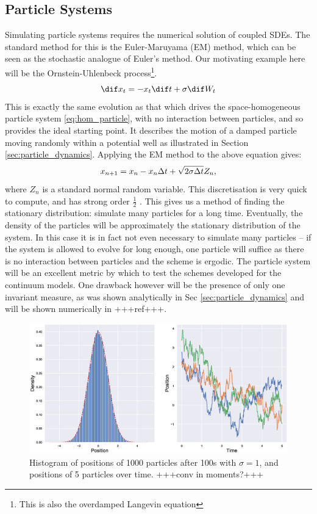     \subsection{Particle Systems}
    Simulating particle systems requires the numerical solution of coupled SDEs. The standard method for this is the Euler-Maruyama (EM) method, which can be seen as the stochastic analogue of Euler's method. Our motivating example here will be the Ornstein-Uhlenbeck process\footnote{This is also the overdamped Langevin equation}. 
    \begin{equation}
    \dif x_t = - x_t \dif t + \sigma \dif W_t
    \end{equation}
    This is exactly the same evolution as that which drives the space-homogeneous particle system \eqref{eq:hom_particle}, with no interaction between particles, and so provides the ideal starting point. It describes the motion of a damped particle moving randomly within a potential well as illustrated in Section \ref{sec:particle_dynamics}. Applying the EM method to the above equation gives:
    \[ x_{n+1} = x_n -  x_n\Delta t + \sqrt{2\sigma\Delta t}Z_n,  \]
    where $Z_n$ is a standard normal random variable. This discretisation is very quick to compute, and has strong order $\frac{1}{2}$ \cite{Higham01}. This gives us a method of finding the stationary distribution: simulate many particles for a long time. Eventually, the density of the particles will be approximately the stationary distribution of the system. In this case it is in fact not even necessary to simulate many particles -- if the system is allowed to evolve for long enough, one particle will suffice as there is no interaction between particles and the scheme is ergodic. The particle system will be an excellent metric by which to test the schemes developed for the continuum models. One drawback however will be the presence of only one invariant measure, as was shown analytically in Sec \ref{sec:particle_dynamics} and will be shown numerically in +++ref+++.
    \begin{figure}
        \centering
        \includegraphics[width=0.7\linewidth]{Figures/OUparticletraj}
        \caption{Histogram of positions of 1000 particles after 100s with $\sigma = 1$, and positions of 5 particles over time. +++conv in moments?+++}
        \label{fig:ouparticletraj}
    \end{figure}
    
